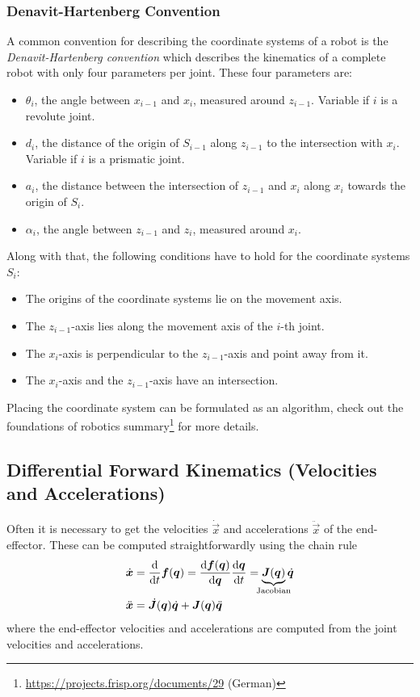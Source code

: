 			\subsubsection{Denavit-Hartenberg Convention}
				A common convention for describing the coordinate systems of a robot is the \emph{Denavit-Hartenberg convention} which describes the kinematics of a complete robot with only four parameters per joint. These four parameters are:
				\begin{itemize}
					\item \(\theta_i\), the angle between \(x_{i - 1}\) and \(x_i\), measured around \(z_{i - 1}\). Variable if \(i\) is a revolute joint.
					\item \(d_i\), the distance of the origin of \(S_{i - 1}\) along \(z_{i - 1}\) to the intersection with \(x_i\). Variable if \(i\) is a prismatic joint.
					\item \(a_i\), the distance between the intersection of \(z_{i - 1}\) and \(x_i\) along \(x_i\) towards the origin of \(S_i\).
					\item \(\alpha_i\), the angle between \(z_{i - 1}\) and \(z_i\), measured around \(x_i\).
				\end{itemize}
				Along with that, the following conditions have to hold for the coordinate systems \(S_i\):
				\begin{itemize}
					\item The origins of the coordinate systems lie on the movement axis.
					\item The \(z_{i - 1}\)-axis lies along the movement axis of the \(i\)-th joint.
					\item The \(x_i\)-axis is perpendicular to the \(z_{i - 1}\)-axis and point away from it.
					\item The \(x_i\)-axis and the \(z_{i - 1}\)-axis have an intersection.
				\end{itemize}
				Placing the coordinate system can be formulated as an algorithm, check out the foundations of robotics summary\footnote{\url{https://projects.frisp.org/documents/29} (German)} for more details.

		\subsection{Differential Forward Kinematics (Velocities and Accelerations)}
			Often it is necessary to get the velocities \(\dot{\vec{x}}\) and accelerations \(\ddot{\vec{x}}\) of the end-effector. These can be computed straightforwardly using the chain rule
			\begin{align}
				\dot{\vec{x}} &= \dv{t} \vec{f}(\vec{q}) = \dv{\vec{f}(\vec{q})}{\vec{q}} \dv{\vec{q}}{t} = \underbrace{\mat{J}(\vec{q})}_{\mathclap{\text{Jacobian}}} \dot{\vec{q}}  \label{eq:diffForwardKin} \\
				\ddot{\vec{x}} &= \dot{\mat{J}}(\vec{q}) \dot{\vec{q}} + \mat{J}(\vec{q}) \ddot{\vec{q}}  \nonumber
			\end{align}
			where the end-effector velocities and accelerations are computed from the joint velocities and accelerations.

